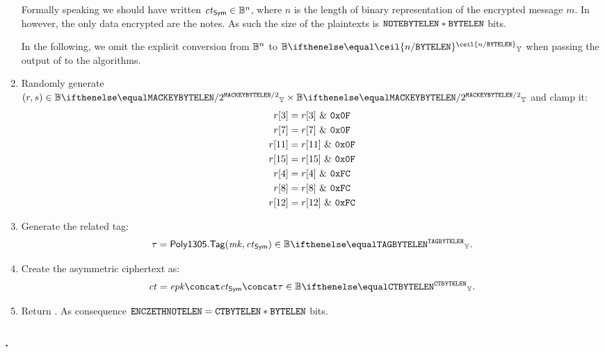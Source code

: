 \begin{enumerate}
    \begin{remark}
        Formally speaking we should have written $\mathit{ct}_{\mathsf{Sym}} \in \mathbb{B}^{n}$, where $n$ is the length of binary representation of the encrypted message $m$. In \zeth{} however, the only data encrypted are the notes. As such the size of the plaintexts is $\mathtt{NOTEBYTELEN} * \mathtt{BYTELEN}$ bits.
    \end{remark}
    \begin{remark}
        In the following, we omit the explicit conversion from $\mathbb{B}^{n}$ to $\BBy{\ceil{n/\byteLen}}$ when passing the output of  to the  algorithms.
    \end{remark}
    \item Randomly generate $(r,s) \in \BBy{\macKeyByteLen/2} \times \BBy{\macKeyByteLen/2}$ and clamp it:
    \begin{align*}
        r[3] &= r[3]\ \&\ \texttt{0x0F}\\
        r[7] &= r[7]\ \&\ \texttt{0x0F}\\
        r[11] &= r[11]\ \&\ \texttt{0x0F}\\
        r[15] &= r[15]\ \&\ \texttt{0x0F}\\
        r[4] &= r[4]\ \&\ \texttt{0xFC}\\
        r[8] &= r[8]\ \&\ \texttt{0xFC}\\
        r[12] &= r[12]\ \&\ \texttt{0xFC}
    \end{align*}
    \item Generate the related tag:
    \[
        \tau = \polymac{1305}.\tagg(\mk, \ct_{\sym}) \in \BBy{\tagByteLen}.
    \]
    \item Create the asymmetric ciphertext as:
    \[
        \ct = \epk \concat \ct_{\sym} \concat \tau \in \BBy{\ctByteLen}.
    \]
    \item Return \ct.
    As consequence $\mathtt{ENCZETHNOTELEN}{} = \mathtt{CTBYTELEN}*\mathtt{BYTELEN} $ bits.
\end{enumerate}

\subsubsection{\encscheme.\dec}

